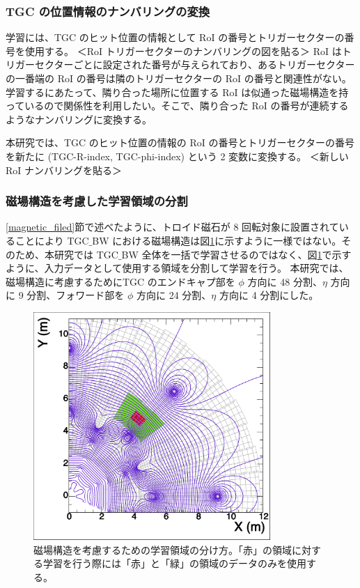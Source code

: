 \subsubsection{TGC の位置情報のナンバリングの変換}
学習には、TGC のヒット位置の情報として RoI の番号とトリガーセクターの番号を使用する。
＜RoI トリガーセクターのナンバリングの図を貼る＞
RoI はトリガーセクターごとに設定された番号が与えられており、あるトリガーセクターの一番端の RoI の番号は隣のトリガーセクターの RoI の番号と関連性がない。
学習するにあたって、隣り合った場所に位置する RoI は似通った磁場構造を持っているので関係性を利用したい。そこで、隣り合った RoI の番号が連続するようなナンバリングに変換する。

本研究では、TGC のヒット位置の情報の RoI の番号とトリガーセクターの番号を新たに (TGC-R-index, TGC-phi-index) という 2 変数に変換する。
＜新しいRoI ナンバリングを貼る＞


\subsubsection{磁場構造を考慮した学習領域の分割}
\ref{magnetic_filed}節で述べたように、トロイド磁石が 8 回転対象に設置されていることにより TGC$\_$BW における磁場構造は図\ref{fig:Mag}に示すように一様ではない。そのため、本研究では TGC$\_$BW 全体を一括で学習させるのではなく、図\ref{fig:Mag}で示すように、入力データとして使用する領域を分割して学習を行う。
本研究では、磁場構造に考慮するためにTGC のエンドキャプ部を $\phi$ 方向に 48 分割、$\eta$ 方向に 9 分割、フォワード部を $\phi$ 方向に 24 分割、$\eta$ 方向に 4 分割にした。
\begin{figure}[tb]
  \centering
  \includegraphics[clip, width=9cm]{fig/4/c1_withMag.pdf}
  \caption{磁場構造を考慮するための学習領域の分け方。「赤」の領域に対する学習を行う際には「赤」と「緑」の領域のデータのみを使用する。}
  \label{fig:Mag}
\end{figure}

